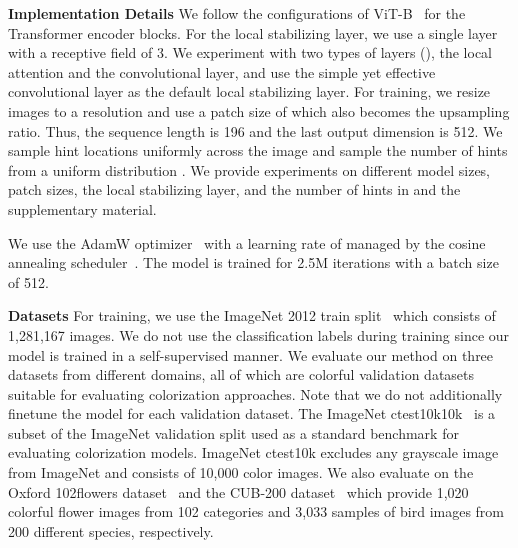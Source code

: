 \documentclass[10pt,twocolumn,letterpaper]{article}
\begin{document}
\noindent \textbf{Implementation Details} 
We follow the configurations of ViT-B~\cite{vit} for the Transformer encoder blocks. 
For the local stabilizing layer, we use a single layer with a receptive field of 3. 
We experiment with two types of layers (), the local attention and the convolutional layer, and use the simple yet effective convolutional layer as the default local stabilizing layer. 
For training, we resize images to a  resolution and use a patch size of  which also becomes the upsampling ratio. 
Thus, the sequence length  is 196 and the last output dimension  is 512. 
We sample hint locations uniformly across the image and sample the number of hints from a uniform distribution . 
We provide experiments on different model sizes, patch sizes, the local stabilizing layer, and the number of hints in  and the supplementary material. 

We use the AdamW optimizer~\cite{adamw} with a learning rate of  managed by the cosine annealing scheduler~\cite{coslr}. 
The model is trained for 2.5M iterations with a batch size of 512. 

\vspace{+0.1cm}
\noindent \textbf{Datasets}
For training, we use the ImageNet 2012 train split~\cite{imagenet} which consists of 1,281,167 images. 
We do not use the classification labels during training since our model is trained in a self-supervised manner. 
We evaluate our method on three datasets from different domains, all of which are colorful validation datasets suitable for evaluating colorization approaches. 
Note that we do not additionally finetune the model for each validation dataset. 
The ImageNet ctest10k10k~\cite{ctest} is a subset of the ImageNet validation split used as a standard benchmark for evaluating colorization models. 
ImageNet ctest10k excludes any grayscale image from ImageNet and consists of 10,000 color images. 
We also evaluate on the Oxford 102flowers dataset~\cite{flowers} and the CUB-200 dataset~\cite{cub} which provide 1,020 colorful flower images from 102 categories and 3,033 samples of bird images from 200 different species, respectively. 
\end{document}
